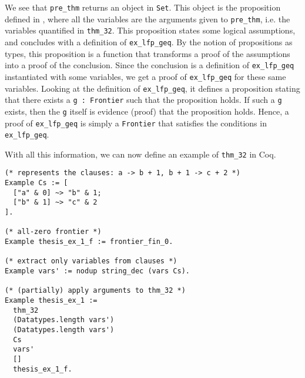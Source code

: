 We see that \lstinline{pre_thm} returns an object in \lstinline{Set}.
This object is the proposition defined in ,
where all the variables are the arguments given to \lstinline{pre_thm}, i.e. the variables quantified in \lstinline{thm_32}.
This proposition states some logical assumptions, and concludes with a definition of \lstinline{ex_lfp_geq}.
By the notion of propositions as types, this proposition is a function
that transforms a proof of the assumptions into a proof of the conclusion.
Since the conclusion is a definition of \lstinline{ex_lfp_geq} instantiated with some variables,
we get a proof of \lstinline{ex_lfp_geq} for these same variables.
Looking at the definition of \lstinline{ex_lfp_geq},
it defines a proposition stating that there exists a \lstinline{g : Frontier} such that the proposition holds.
If such a \lstinline{g} exists, then the \lstinline{g} itself is evidence (proof) that the proposition holds.
Hence, a proof of \lstinline{ex_lfp_geq} is simply a \lstinline{Frontier} that satisfies the conditions in \lstinline{ex_lfp_geq}.

With all this information, we can now define an example of \lstinline{thm_32} in Coq.

\begin{minipage}{\linewidth}
\begin{lstlisting}[language=Coq, label={lst:thm_32_coq_example}, caption={\lstinline{thm_32} example}]
(* represents the clauses: a -> b + 1, b + 1 -> c + 2 *)
Example Cs := [
  ["a" & 0] ~> "b" & 1;
  ["b" & 1] ~> "c" & 2
].

(* all-zero frontier *)
Example thesis_ex_1_f := frontier_fin_0.

(* extract only variables from clauses *)
Example vars' := nodup string_dec (vars Cs).

(* (partially) apply arguments to thm_32 *)
Example thesis_ex_1 :=
  thm_32
  (Datatypes.length vars')
  (Datatypes.length vars')
  Cs
  vars'
  []
  thesis_ex_1_f.
\end{lstlisting}
\end{minipage}

